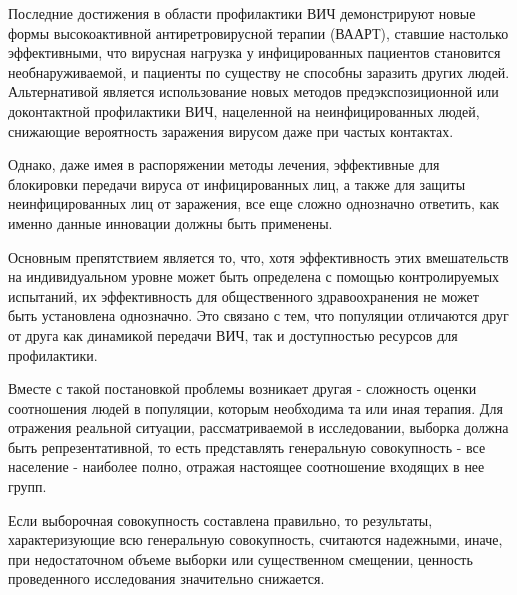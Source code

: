 \documentclass[a4paper]{report}
\begin{document}
	Последние достижения в области профилактики ВИЧ демонстрируют новые формы высокоактивной антиретровирусной терапии (ВААРТ), ставшие настолько эффективными, что вирусная нагрузка у инфицированных пациентов становится необнаруживаемой, и пациенты по существу не способны заразить других людей. Альтернативой является использование новых методов предэкспозиционной или доконтактной профилактики ВИЧ, нацеленной на неинфицированных людей, снижающие вероятность заражения вирусом даже при частых контактах.
	
	Однако, даже имея в распоряжении методы лечения, эффективные для блокировки передачи вируса от инфицированных лиц, а также для защиты неинфицированных лиц от заражения, все еще сложно однозначно ответить, как именно данные инновации должны быть применены.
	
	Основным препятствием является то, что, хотя эффективность этих вмешательств на индивидуальном уровне может быть определена с помощью контролируемых испытаний, их эффективность для общественного здравоохранения не может быть установлена однозначно. Это связано с тем, что популяции отличаются друг от друга как динамикой передачи ВИЧ, так и доступностью ресурсов для профилактики.
	
	
	Вместе с такой постановкой проблемы возникает другая - сложность оценки соотношения людей в популяции, которым необходима та или иная терапия. Для отражения реальной ситуации, рассматриваемой в исследовании, выборка должна быть репрезентативной, то есть представлять генеральную совокупность - все население - наиболее полно, отражая настоящее соотношение входящих в нее групп.	

	Если выборочная совокупность составлена правильно, то результаты, характеризующие всю генеральную совокупность, считаются надежными, иначе, при недостаточном объеме выборки или существенном смещении, ценность проведенного исследования значительно снижается.
\end{document}

